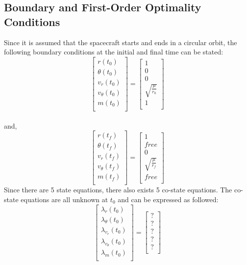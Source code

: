 \documentclass[]{article}
\begin{document}
\subsection{Boundary and First-Order Optimality Conditions}
Since it is assumed that the spacecraft starts and ends in a circular orbit, the following boundary conditions at the initial and final time can be stated:
\[
\begin{bmatrix}
	r(t_0)\\
	\theta(t_0)\\
	v_r(t_0)\\
	v_{\theta}(t_0)\\
	m(t_0)\\
\end{bmatrix}
=
\begin{bmatrix}
	1\\
	0\\
	0\\
	\sqrt{\frac{\mu}{r_0}}\\
	1\\
\end{bmatrix}
\]\\
and,
\[
\begin{bmatrix}
	r(t_f)\\
	\theta(t_f)\\
	v_r(t_f)\\
	v_{\theta}(t_f)\\
	m(t_f)\\
\end{bmatrix}
=
\begin{bmatrix}
	1\\
	free\\
	0\\
	\sqrt{\frac{\mu}{r_f}}\\
	free\\
\end{bmatrix}
\]
Since there are 5 state equations, there also exists 5 co-state equations. The co-state equations are all unknown at \(t_0\) and can be expressed as followed:
\[
\begin{bmatrix}
	\lambda_{r}(t_0)\\
	\lambda_{\theta}(t_0)\\
	\lambda_{v_r}(t_0)\\
	\lambda_{v_{\theta}}(t_0)\\
	\lambda_{m}(t_0)\\
\end{bmatrix}
=
\begin{bmatrix}
	?\\
	?\\
	?\\
	?\\
	?\\
\end{bmatrix}
\]
\end{document}
